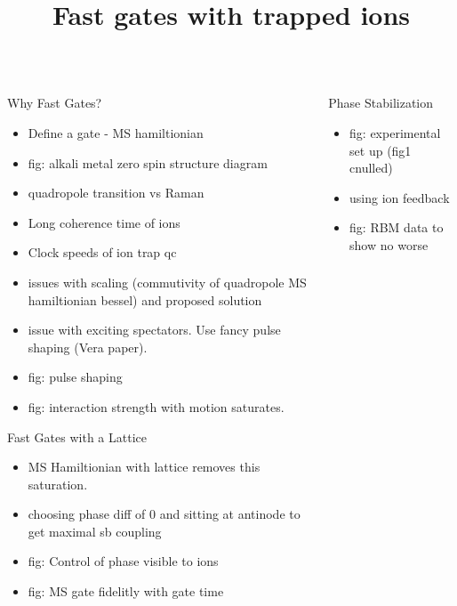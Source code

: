 \documentclass[final]{beamer}
\title[FastGates]{Fast gates with trapped ions}
\begin{document}
\begin{frame}{} 

\begin{center}
\begin{columns}[T,onlytextwidth]
  \begin{column}{0.48\textwidth}

    \begin{block}{Why Fast Gates?}
      \begin{itemize}
      \item Define a gate - MS hamiltionian
      \item fig: alkali metal zero spin structure diagram
      \item quadropole transition vs Raman

      \item Long coherence time of ions 
      \item Clock speeds of ion trap qc
      \item issues with scaling (commutivity of quadropole MS hamiltionian bessel) and proposed solution
      \item issue with exciting spectators. Use fancy pulse shaping (Vera paper).
      \item fig: pulse shaping
      \item fig: interaction strength with motion saturates.
      \end{itemize}
    \end{block}


    \begin{block}{Fast Gates with a Lattice}
      \begin{itemize}
      \item MS Hamiltionian with lattice removes this saturation.
      \item choosing phase diff of 0 and sitting at antinode to get maximal sb coupling
      \item fig: Control of phase visible to ions
      \item fig: MS gate fidelitly with gate time
      \end{itemize}
    \end{block}

  \end{column}


  \begin{column}{0.48\textwidth}

    \begin{block}{Phase Stabilization}
      \begin{itemize}
      \item fig: experimental set up (fig1 cnulled)
      \item using ion feedback
      \item fig: RBM data to show no worse
      \end{itemize}
    \end{block}



\end{column}
\end{columns}
\end{center}
\end{frame}
\end{document}
